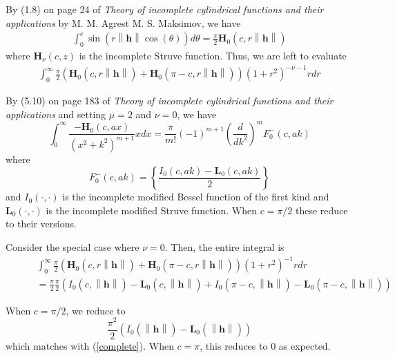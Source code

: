 \documentclass[11pt]{article}
\begin{document}
 By (1.8) on page 24 of \textit{Theory of incomplete cylindrical functions and their applications} by M. M. Agrest  M. S. Maksimov, we have \begin{align*}
 \int_0^{c}  \sin(r\left\lVert \boldsymbol{h}\right\rVert \cos(\theta)) d\theta= \frac{\pi}{2} \boldsymbol{H}_{0}(c, r\left\lVert \boldsymbol{h}\right\rVert)
 \end{align*}where $\boldsymbol{H}_{\nu}(c, z)$ is the incomplete Struve function. Thus, we are left to evaluate \begin{align*} 
 \int_0^\infty \frac{\pi}{2}\left(\boldsymbol{H}_{0}(c, r\left\lVert \boldsymbol{h}\right\rVert) + \boldsymbol{H}_{0}(\pi - c, r\left\lVert \boldsymbol{h}\right\rVert)\right) (1+r^2)^{-\nu-1} r dr
 \end{align*}
 
 
 
By (5.10) on page 183 of \textit{Theory of incomplete cylindrical functions and their applications} and setting $\mu = 2$ and $\nu = 0$, we have $$\int_0^\infty \frac{-\boldsymbol{H}_{0}(c, ax)}{(x^2 + k^2)^{m+1}}x dx = \frac{\pi}{m!} (-1)^{m+1} \left(\frac{d}{dk^2}\right)^{m} F_0^-(c, ak)$$where $$F_0^-(c, ak)=\left\{\frac{I_{0}(c, ak) - \boldsymbol{L}_0(c, ak)}{2}\right\}$$and $I_0(\cdot, \cdot)$ is the incomplete modified Bessel function of the first kind and $\boldsymbol{L}_0(\cdot, \cdot)$ is the incomplete modified Struve function. When $c=  \pi/2$ these reduce to their  versions. %

Consider the special case where $\nu = 0$. Then, the entire integral is \begin{align*}
&\int_0^\infty\frac{\pi}{2} \left(\boldsymbol{H}_{0}(c, r\left\lVert \boldsymbol{h}\right\rVert) + \boldsymbol{H}_{0}(\pi - c, r\left\lVert \boldsymbol{h}\right\rVert)\right) (1 + r^2)^{-1} r dr \\
\ \ \ \ \ \ \ \ \ &= \frac{\pi}{2} \frac{\pi}{2}\left( I_0(c, \left\lVert \boldsymbol{h}\right\rVert) - \boldsymbol{L}_0(c,\left\lVert \boldsymbol{h}\right\rVert) + I_0(\pi - c, \left\lVert \boldsymbol{h}\right\rVert) - \boldsymbol{L}_0(\pi - c,\left\lVert \boldsymbol{h}\right\rVert)\right)
\end{align*}

When $c = \pi/2$, we reduce to $$\frac{\pi^2}{2} \left( I_0(\left\lVert \boldsymbol{h}\right\rVert) - \boldsymbol{L}_0(\left\lVert \boldsymbol{h}\right\rVert) \right)$$which matches with (\ref{complete}). When $c = \pi$, this reduces to $0$ as expected. 
\end{document}
